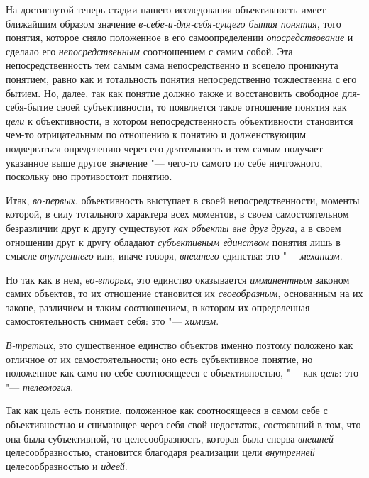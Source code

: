 На достигнутой теперь стадии нашего исследования объективность
имеет ближайшим образом значение {\em в-себе-и-для-себя-сущего бытия
понятия}, того понятия, которое сняло положенное в его
самоопределении {\em опосредствование} и сделало его {\em непосредственным}
соотношением с самим собой. Эта непосредственность тем самым
сама непосредственно и всецело проникнута понятием, равно как и тотальность
понятия непосредственно тождественна с его бытием. Но, далее, так как
понятие должно также и восстановить свободное для-себя-бытие своей
субъективности, то появляется такое отношение понятия как {\em цели} к
объективности, в котором непосредственность объективности становится чем-то
отрицательным по отношению к понятию и долженствующим подвергаться
определению через его деятельность и тем самым получает указанное выше
другое значение "--- чего-то самого по себе ничтожного,
поскольку оно противостоит понятию.

Итак, {\em во-первых}, объективность выступает в своей непосредственности,
моменты которой, в силу тотального характера всех моментов, в своем
самостоятельном безразличии друг к другу существуют {\em как объекты вне друг
друга}, а в своем отношении друг к другу обладают {\em субъективным единством}
понятия лишь в смысле {\em внутреннего} или, иначе говоря, {\em внешнего}
единства: это "--- {\em механизм}.

Но так как в нем, {\em во-вторых}, это единство оказывается {\em имманентным}
законом самих объектов, то их отношение становится их {\em своеобразным},
основанным на их законе, различием и таким соотношением, в
котором их определенная самостоятельность снимает себя: это "--- {\em химизм}.

{\em В-третьих}, это
существенное единство объектов именно поэтому положено как отличное от их
самостоятельности; оно есть субъективное понятие, но положенное как само по
себе соотносящееся с объективностью, "--- как
{\em цель}: это "--- {\em телеология}.

Так как цель есть понятие, положенное как соотносящееся в
самом себе с объективностью и снимающее через себя свой недостаток,
состоявший в том, что она была субъективной, то целесообразность, которая
была сперва {\em внешней} целесообразностью, становится благодаря реализации
цели {\em внутренней} целесообразностью и {\em идеей}.

